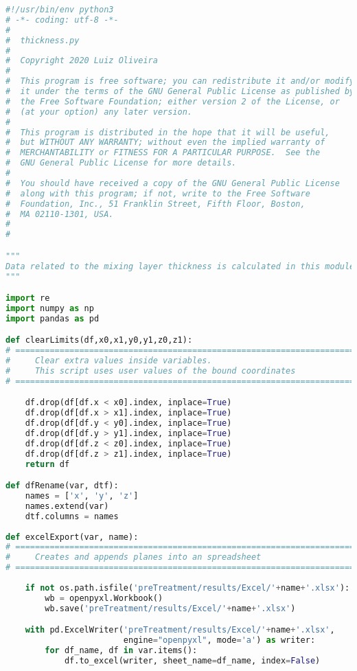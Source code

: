 \begin{lstlisting}[language=python]
#!/usr/bin/env python3
# -*- coding: utf-8 -*-
#
#  thickness.py
#  
#  Copyright 2020 Luiz Oliveira
#  
#  This program is free software; you can redistribute it and/or modify
#  it under the terms of the GNU General Public License as published by
#  the Free Software Foundation; either version 2 of the License, or
#  (at your option) any later version.
#  
#  This program is distributed in the hope that it will be useful,
#  but WITHOUT ANY WARRANTY; without even the implied warranty of
#  MERCHANTABILITY or FITNESS FOR A PARTICULAR PURPOSE.  See the
#  GNU General Public License for more details.
#  
#  You should have received a copy of the GNU General Public License
#  along with this program; if not, write to the Free Software
#  Foundation, Inc., 51 Franklin Street, Fifth Floor, Boston,
#  MA 02110-1301, USA.
#  
#  

"""
Data related to the mixing layer thickness is calculated in this module
"""

import re
import numpy as np
import pandas as pd

def clearLimits(df,x0,x1,y0,y1,z0,z1):
# =============================================================================
#     Clear extra values inside variables.
#     This script uses user values of the bound coordinates
# =============================================================================

    df.drop(df[df.x < x0].index, inplace=True)
    df.drop(df[df.x > x1].index, inplace=True)
    df.drop(df[df.y < y0].index, inplace=True)
    df.drop(df[df.y > y1].index, inplace=True)
    df.drop(df[df.z < z0].index, inplace=True)
    df.drop(df[df.z > z1].index, inplace=True)
    return df

def dfRename(var, dtf):
    names = ['x', 'y', 'z']
    names.extend(var)
    dtf.columns = names
    
def excelExport(var, name):
# =============================================================================
#     Creates and appends planes into an spreadsheet
# =============================================================================
    
    if not os.path.isfile('preTreatment/results/Excel/'+name+'.xlsx'):
        wb = openpyxl.Workbook()
        wb.save('preTreatment/results/Excel/'+name+'.xlsx')

    with pd.ExcelWriter('preTreatment/results/Excel/'+name+'.xlsx',
                        engine="openpyxl", mode='a') as writer:
        for df_name, df in var.items():
            df.to_excel(writer, sheet_name=df_name, index=False)


\end{lstlisting}
